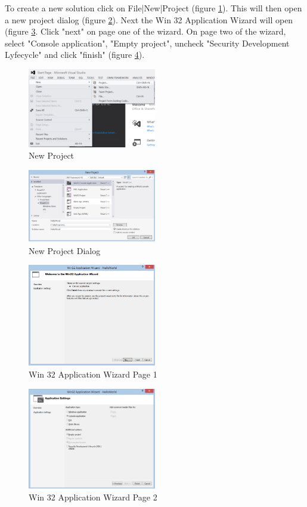 To create a new solution click on File|New|Project (figure \ref{fig:new-project}). 
This will then open a new project dialog (figure  \ref{fig:new-project-dialog}).
Next the Win 32 Application Wizard will open (figure \ref{fig:win32-application-wizard-page1}.
Click "next" on page one of the  wizard. 
On page two of the wizard, select "Console application", "Empty project", uncheck "Security Development Lyfecycle" and click "finish" (figure \ref{fig:win32-application-wizard-page2}).
\begin{figure}
  \centering
  \includegraphics[width=0.5\textwidth]{diagrams/new_project.pdf}
  \caption{New Project}\label{fig:new-project}
\end{figure}
\begin{figure}
  \centering
  \includegraphics[width=0.5\textwidth]{diagrams/new_project_dialog.pdf}
  \caption{New Project Dialog}\label{fig:new-project-dialog}
\end{figure}
\begin{figure}
  \centering
  \includegraphics[width=0.5\textwidth]{diagrams/win32_application_wizard_page1.pdf}
  \caption{Win 32 Application Wizard Page 1}\label{fig:win32-application-wizard-page1}
\end{figure}
\begin{figure}
  \centering
  \includegraphics[width=0.5\textwidth]{diagrams/win32_application_wizard_page2.pdf}
  \caption{Win 32 Application Wizard Page 2}\label{fig:win32-application-wizard-page2}
\end{figure}